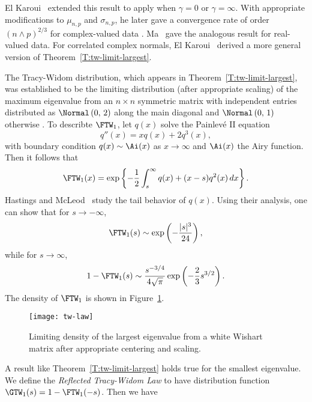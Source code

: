 \noindent
El Karoui~\cite{elkaroui2003lew} extended this result to apply when $\gamma = 0$ or $\gamma = \infty$.  With appropriate modifications to $\mu_{n,p}$ and $\sigma_{n,p}$, he later gave a convergence rate of order $(n \wedge p)^{2/3}$  for complex-valued data \cite{elkaroui2006mpt}.  Ma~\cite{ma2008atw} gave the analogous result for real-valued data.  For correlated complex normals, El Karoui~\cite{elkaroui2007twl} derived a more general version of Theorem~\ref{T:tw-limit-largest}.  

The Tracy-Widom distribution, which appears in Theorem~\ref{T:tw-limit-largest}, was  established to be the limiting distribution (after appropriate scaling) of the maximum eigenvalue from an $n \times n$ symmetric matrix with independent entries distributed as $\Normal\left( 0, \, 2 \right)$ along the main diagonal and $\Normal\left( 0, \, 1 \right)$ otherwise \cite{tracy1994lsd} \cite{tracy1996oas}.  To describte $\FTW_1$, let $q(x)$ solve the Painlev\'e II equation
\[
    q''(x) = x q(x) + 2 q^3(x),
\]
with boundary condition $q(x) \sim \Ai(x)$ as $x \to \infty$ and $\Ai(x)$ the Airy function.  Then it follows that
\[
    \FTW_1(x)
    =
    \exp \left\{
        -
        \frac{1}{2}
        \int_s^\infty
            q(x)
            +
            (x-s) q^2 (x)
            \,
            dx
    \right\}.
\]
Hastings and McLeod~\cite{hastings1980bvp} study the tail behavior of $q(x)$.  Using their analysis, one can show \cite{perry2009mre} that for $s \to -\infty$, 
\[
    \FTW_1(s)
    \sim
    \exp \left(
        -\frac{|s|^3}{24}
    \right),
\]
while for $s \to \infty$,
\[
    1 - \FTW_1(s)
    \sim
    \frac{ s^{-3/4} }
         { 4 \sqrt{ \pi } }
    \exp \left(
        -
        \frac{2}{3}
        s^{3/2}
    \right).
\]
The density of $\FTW_1$ is shown in Figure~\ref{F:tw-density}.

\begin{figure}
    \centering
    \texttt{[image: tw-law]}
    \caption{
        Limiting density of the largest eigenvalue from a white Wishart
        matrix after appropriate centering and scaling.
    }
    \label{F:tw-density}
\end{figure}

A result like Theorem~\ref{T:tw-limit-largest} holds true for the smallest eigenvalue.  We define the \emph{Reflected Tracy-Widom Law} to have distribution function $\GTW_1(s) = 1 - \FTW_1(-s)$.  Then we have 

